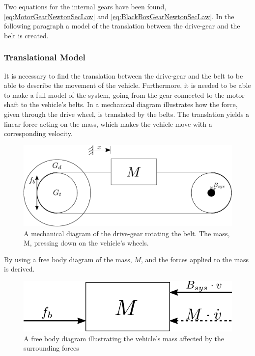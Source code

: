Two equations for the internal gears have been found, \eqref{eq:MotorGearNewtonSecLaw} and \eqref{eq:BlackBoxGearNewtonSecLaw}. In the following paragraph a model of the translation between the drive-gear and the belt is created.

\subsubsection{Translational Model}\label{BeltModel}
It is necessary to find the translation between the drive-gear and the belt to be able to describe the movement of the vehicle. Furthermore, it is needed to be able to make a full model of the system, going from the gear connected to the motor shaft to the vehicle's belts. In  a mechanical diagram illustrates how the force, given through the drive wheel, is translated by the belts. The translation yields a linear force acting on the mass, which makes the vehicle move with a corresponding velocity.
%
\begin{figure}[H]
	\centering
	\includegraphics[scale=0.8]{figures/mechanicalDrawingBelt.pdf}
	\caption{A mechanical diagram of the drive-gear rotating the belt. The mass, M, pressing down on the vehicle's wheels.}
	\label{fig:BeltMechanicalDiagram}
\end{figure}
%
By using  a free body diagram of the mass, $M$, and the forces applied to the mass is derived.
%
\begin{figure}[H]
	\centering
	\includegraphics[scale=.8]{figures/freeBodyBelt.pdf}
	\caption{A free body diagram illustrating the vehicle's mass affected by the surrounding forces}
	\label{fig:BeltFreeBodyDiagram}
\end{figure}

